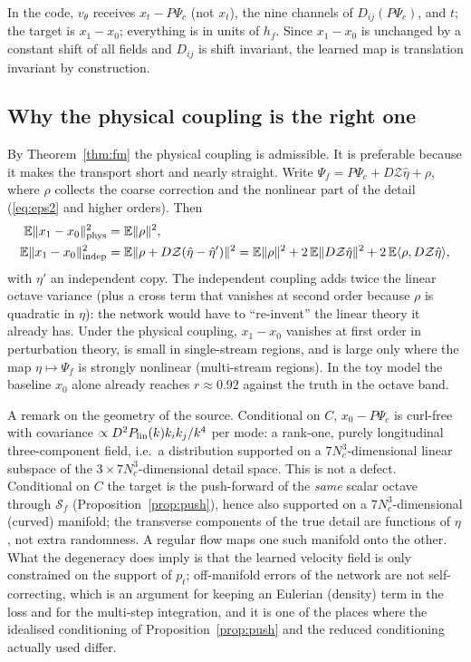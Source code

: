 \documentclass[11pt]{article}
\theoremstyle{definition}
\newcommand{\Psic}{\Psi_{c}}
\newcommand{\Psif}{\Psi_{f}}
\newcommand{\E}{\mathbb{E}}
\newcommand{\lin}{{\rm lin}}
\newcommand{\Zel}{\mathcal{Z}}
\newcommand{\Nbody}{\mathcal{S}}
\begin{document}
In the code, $v_\theta$ receives $x_t-P\Psic$ (not $x_t$), the nine channels of $D_{ij}(P\Psic)$, and $t$; the target is $x_1-x_0$; everything is in units of $h_f$. Since $x_1-x_0$ is unchanged by a constant shift of all fields and $D_{ij}$ is shift invariant, the learned map is translation invariant by construction.

\subsection{Why the physical coupling is the right one}

By Theorem~\ref{thm:fm} the physical coupling is admissible. It is preferable because it makes the transport short and nearly straight. Write $\Psif=P\Psic+D\Zel\hat\eta+\rho$, where $\rho$ collects the coarse correction and the nonlinear part of the detail (\eqref{eq:eps2} and higher orders). Then
\begin{align}
\E\|x_1-x_0\|^2_{\rm phys}&=\E\|\rho\|^2,\\
\E\|x_1-x_0\|^2_{\rm indep}&=\E\|\rho+D\Zel(\hat\eta-\hat\eta')\|^2=\E\|\rho\|^2+2\,\E\|D\Zel\hat\eta\|^2+2\,\E\langle\rho,D\Zel\hat\eta\rangle,
\end{align}
with $\eta'$ an independent copy. The independent coupling adds twice the linear octave variance (plus a cross term that vanishes at second order because $\rho$ is quadratic in $\eta$): the network would have to ``re-invent'' the linear theory it already has. Under the physical coupling, $x_1-x_0$ vanishes at first order in perturbation theory, is small in single-stream regions, and is large only where the map $\eta\mapsto\Psif$ is strongly nonlinear (multi-stream regions). In the toy model the baseline $x_0$ alone already reaches $r\approx0.92$ against the truth in the octave band.

A remark on the geometry of the source. Conditional on $C$, $x_0-P\Psic$ is curl-free with covariance $\propto D^2P_\lin(k)k_ik_j/k^4$ per mode: a rank-one, purely longitudinal three-component field, i.e.\ a distribution supported on a $7N_c^3$-dimensional linear subspace of the $3\times7N_c^3$-dimensional detail space. This is not a defect. Conditional on $C$ the target is the push-forward of the \emph{same} scalar octave through $\Nbody_f$ (Proposition~\ref{prop:push}), hence also supported on a $7N_c^3$-dimensional (curved) manifold; the transverse components of the true detail are functions of $\eta$, not extra randomness. A regular flow maps one such manifold onto the other. What the degeneracy does imply is that the learned velocity field is only constrained on the support of $p_t$; off-manifold errors of the network are not self-correcting, which is an argument for keeping an Eulerian (density) term in the loss and for the multi-step integration, and it is one of the places where the idealised conditioning of Proposition~\ref{prop:push} and the reduced conditioning actually used differ.
\end{document}

